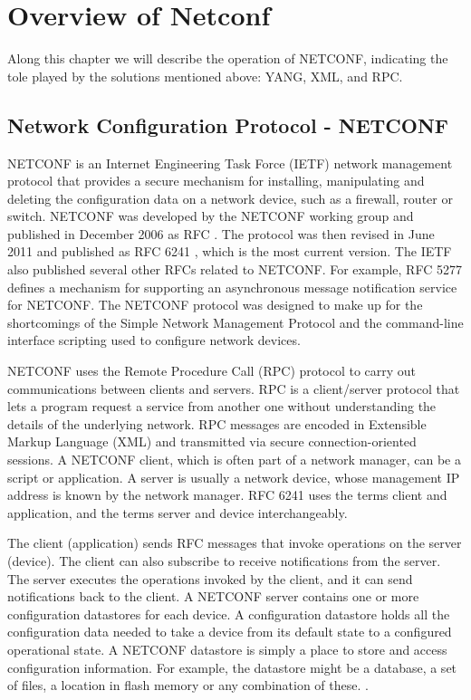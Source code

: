 \chapter{Overview of Netconf}

Along this chapter we will describe the operation of \gls{NETCONF}, indicating the tole played by the solutions mentioned above: \gls{YANG}, \gls{XML}, and \gls{RPC}.  

\section{Network Configuration Protocol - NETCONF}

\gls{NETCONF} is an Internet Engineering Task Force (IETF) network management protocol that provides a secure mechanism for installing, manipulating and deleting the configuration data on a network device, such as a firewall, router or switch.
NETCONF was developed by the NETCONF working group and published in December 2006 as RFC \cite{rfc4741}. The protocol was then revised in June 2011 and published as RFC 6241 \cite{rfc6241}, which is the most current version. The IETF also published several other RFCs related to NETCONF. For example, RFC 5277 \cite{rfc5277} defines a mechanism for supporting an asynchronous message notification service for NETCONF.
The NETCONF protocol was designed to make up for the shortcomings of the Simple Network Management Protocol and the command-line interface scripting used to configure network devices.

NETCONF uses the Remote Procedure Call (RPC) protocol to carry out communications between clients and servers. RPC is a client/server protocol that lets a program request a service from another one without understanding the details of the underlying network. RPC messages are encoded in Extensible Markup Language (XML) and transmitted via secure connection-oriented sessions.
A NETCONF client, which is often part of a network manager, can be a script or application. A server is usually a network device, whose management IP address is known by the network manager. RFC 6241 uses the terms client and application, and the terms server and device interchangeably.

The client (application) sends RFC messages that invoke operations on the server (device). The client can also subscribe to receive notifications from the server. The server executes the operations invoked by the client, and it can send notifications back to the client. A NETCONF server contains one or more configuration datastores for each device. A configuration datastore holds all the configuration data needed to take a device from its default state to a configured operational state. A NETCONF datastore is simply a place to store and access configuration information. For example, the datastore might be a database, a set of files, a location in flash memory or any combination of these. .

